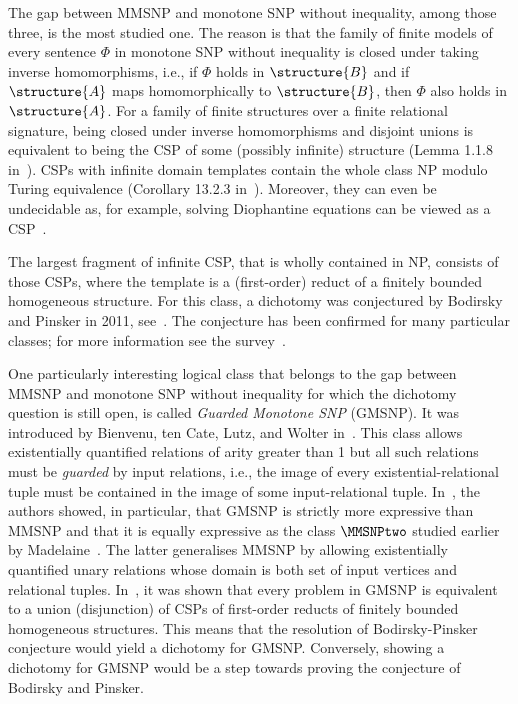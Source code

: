 \documentclass{lmcs}
\begin{document}
The gap between MMSNP and monotone SNP without inequality, among those three, is the most studied one.
%
The reason is that the family of finite models of every sentence $\Phi$ in monotone SNP without inequality is closed under taking inverse homomorphisms, i.e., if $\Phi$ holds in $\structure{B}$ and if $\structure{A}$ maps homomorphically to $\structure{B}$, then $\Phi$ also holds in $\structure{A}$.
%
For a family of finite structures over a finite relational signature, being closed under inverse homomorphisms and disjoint unions is equivalent to being the CSP of some (possibly infinite) structure (Lemma 1.1.8 in~\cite{bodirsky_book}).
%
CSPs with infinite domain templates contain the whole class NP modulo Turing equivalence (Corollary 13.2.3 in~\cite{bodirsky_book}).
%
Moreover, they can even be undecidable as, for example, solving Diophantine equations can be viewed as a CSP~\cite{matiyasevich}.

The largest fragment of infinite CSP, that is wholly contained in NP, consists of those CSPs, where the template is a (first-order) reduct of a finitely bounded homogeneous structure.
%
For this class, a dichotomy was conjectured by Bodirsky and Pinsker in 2011, see~\cite{bodirsky_pinsker_conjecture}.
%
The conjecture has been confirmed for many particular classes; for more information see the survey~\cite{pinsker_survey}.

One particularly interesting logical class that belongs to the gap between MMSNP and monotone SNP without inequality for which the dichotomy question is still open, is called \emph{Guarded Monotone SNP} (GMSNP).
%
It was introduced by Bienvenu, ten Cate, Lutz, and Wolter in~\cite{bienvenu2014}.
%
This class allows existentially quantified relations of arity greater than 1 but all such relations must be \emph{guarded} by input relations, i.e., the image of every existential-relational tuple must be contained in the image of some input-relational tuple.
%
In~\cite{bienvenu2014}, the authors showed, in particular, that GMSNP is strictly more expressive than MMSNP and that it is equally expressive as the class $\MMSNPtwo$ studied earlier by Madelaine~\cite{madelaine2009}.
%
The latter generalises MMSNP by allowing existentially quantified unary relations whose domain is both set of input vertices and relational tuples.
%
In~\cite{bodirsky_asnp}, it was shown that every problem in GMSNP is equivalent to a union (disjunction) of CSPs of first-order reducts of finitely bounded homogeneous structures.
%
This means that the resolution of Bodirsky-Pinsker conjecture would yield a dichotomy for GMSNP.
%
Conversely, showing a dichotomy for GMSNP would be a step towards proving the conjecture of Bodirsky and Pinsker.
\end{document}
